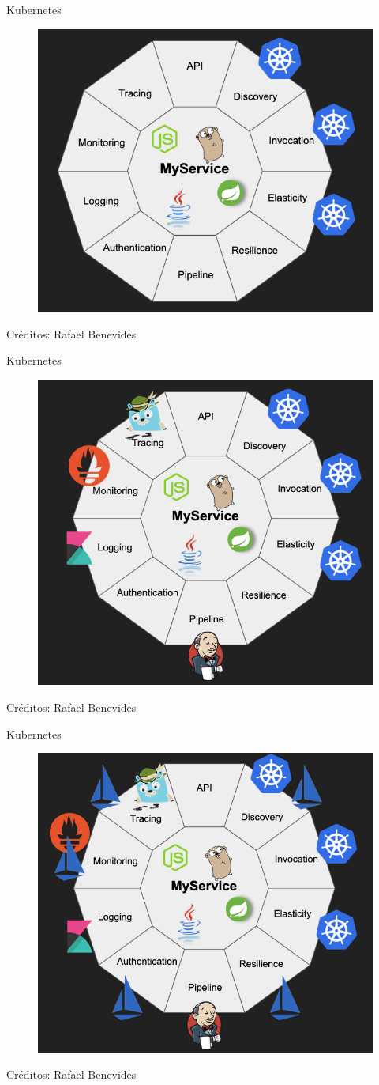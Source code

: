 \documentclass[aspectratio=169]{beamer}
\begin{document}
\begin{frame}{Kubernetes}
    \begin{figure}
        \centering
        \includegraphics[width=0.5\linewidth]{Images/kube1.png}
        \label{fig:container}
    \end{figure}
    
    Créditos: Rafael Benevides
\end{frame}


\begin{frame}{Kubernetes}
    \begin{figure}
        \centering
        \includegraphics[width=0.5\linewidth]{Images/kube2.png}
        \label{fig:container}
    \end{figure}
    
    Créditos: Rafael Benevides
\end{frame}


\begin{frame}{Kubernetes}
    \begin{figure}
        \centering
        \includegraphics[width=0.5\linewidth]{Images/kube3.png}
        \label{fig:container}
    \end{figure}
    
    Créditos: Rafael Benevides
\end{frame}
\end{document}

